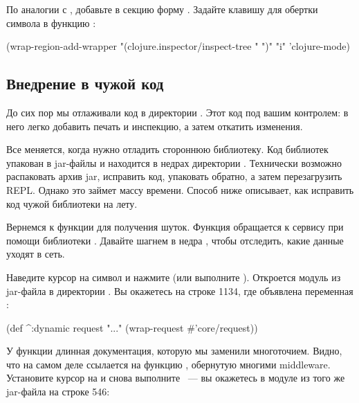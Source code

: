 По аналогии с , добавьте в секцию  форму . Задайте клавишу для обертки символа в функцию :

\begin{english}
  \begin{clojure}
(wrap-region-add-wrapper "(clojure.inspector/inspect-tree " ")" "i" 'clojure-mode)
  \end{clojure}
\end{english}

\subsection{Внедрение в чужой код}

До сих пор мы отлаживали код в директории . Этот код под вашим контролем: в него легко добавить печать и инспекцию, а затем откатить изменения.

Все меняется, когда нужно отладить стороннюю библиотеку. Код библиотек упакован в jar-файлы и находится в недрах директории . Технически возможно распаковать архив jar, исправить код, упаковать обратно, а затем перезагрузить REPL. Однако это займет массу времени. Способ ниже описывает, как исправить код чужой библиотеки на лету.

Вернемся к функции  для получения шуток. Функция обращается к сервису при помощи библиотеки . Давайте шагнем в недра , чтобы отследить, какие данные уходят в сеть.

Наведите курсор на символ  и нажмите  (или выполните ). Откроется модуль  из jar-файла в директории . Вы окажетесь на строке 1134, где объявлена переменная :

\begin{english}
  \begin{clojure}
(def ^:dynamic request
  "..."
  (wrap-request #'core/request))
  \end{clojure}
\end{english}

У функции длинная документация, которую мы заменили многоточием. Видно, что  на самом деле ссылается на функцию , обернутую многими middleware. Установите курсор на  и снова выполните ~--- вы окажетесь в модуле  из того же jar-файла на строке 546:

